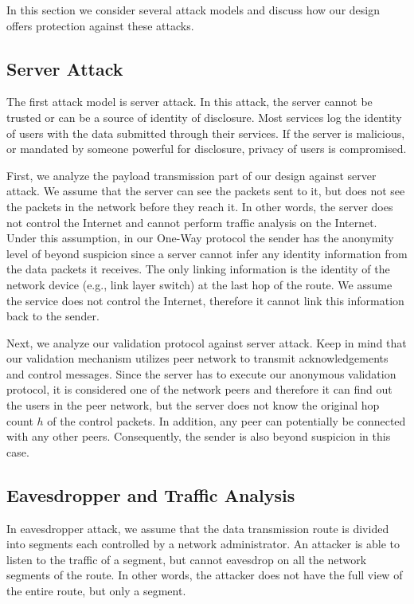 
In this section we consider several attack models and discuss how
our design offers protection against these attacks.

\subsection{Server Attack}
The first attack model is server attack. In this attack, the
server cannot be trusted or can be a source of identity of
disclosure. Most services log the identity of users with the data
submitted through their services. If the server is malicious, or
mandated by someone powerful for disclosure, privacy of users is
compromised.

First, we analyze the payload transmission part of our design
against server attack. We assume that the server can see the
packets sent to it, but does not see the packets in the network
before they reach it. In other words, the server does not control
the Internet and cannot perform traffic analysis on the Internet.
Under this assumption, in our One-Way protocol the sender has the
anonymity level of beyond suspicion since a server cannot infer
any identity information from the data packets it receives. The
only linking information is the identity of the network device
(e.g., link layer switch) at the last hop of the route. We assume
the service does not control the Internet, therefore it cannot
link this information back to the sender.

Next, we analyze our validation protocol against server attack.
Keep in mind that our validation mechanism utilizes peer network
to transmit acknowledgements and control messages. Since the
server has to execute our anonymous validation protocol, it is
considered one of the network peers and therefore it can find out
the users in the peer network, but the server does not know the
original hop count $h$ of the control packets. In addition, any
peer can potentially be connected with any other peers.
Consequently, the sender is also beyond suspicion in this case.

\subsection{Eavesdropper and Traffic Analysis}

In eavesdropper attack, we assume that the data transmission route
is divided into segments each controlled by a network
administrator. An attacker is able to listen to the traffic of a
segment, but cannot eavesdrop on all the network segments of the
route. In other words, the attacker does not have the full view of
the entire route, but only a segment.

